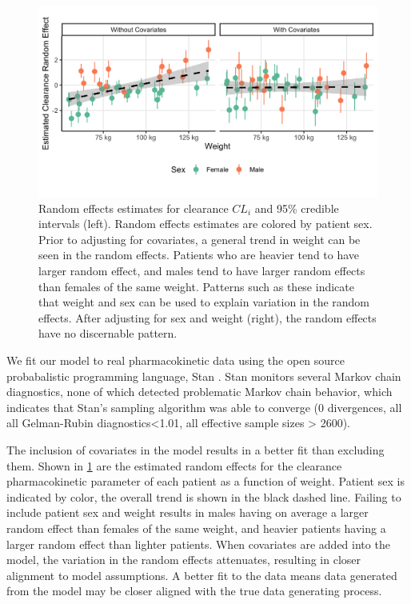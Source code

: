 \begin{figure}
	\centering
	\includegraphics[width=\linewidth]{"figures/random_effects_change.png"}
	\caption{Random effects estimates for clearance $ CL_i $ and 95\% credible intervals (left).  Random effects estimates are colored by patient sex.  Prior to adjusting for covariates, a general trend in weight can be seen in the random effects.  Patients who are heavier tend to have larger random effect, and males tend to have larger random effects than females of the same weight.  Patterns such as these indicate that weight and sex can be used to explain variation in the random effects.  After adjusting for sex and weight (right), the random effects have no discernable pattern.}
	\label{fig:randomeffectschange}
\end{figure}

We fit our model to real pharmacokinetic data using the open source probabalistic programming language, Stan \cite{gelman2015stan}.  Stan monitors several Markov chain diagnostics, none of which detected problematic Markov chain behavior, which indicates that Stan’s sampling algorithm was able to converge (0 divergences, all all Gelman-Rubin diagnostics<1.01, all effective sample sizes  > 2600).  

The inclusion of covariates in the model results in a better fit than excluding them. Shown in \cref{fig:randomeffectschange} are the estimated random effects for the clearance pharmacokinetic parameter of each patient as a function of weight.  Patient sex is indicated by color, the overall trend is shown in the black dashed line.  Failing to include patient sex and weight results in males having on average a larger random effect than females of the same weight, and heavier patients having a larger random effect than lighter patients.  When covariates are added into the model, the variation in the random effects attenuates, resulting in closer alignment to model assumptions. A better fit to the data means data generated from the model may be closer aligned with the true data generating process.

